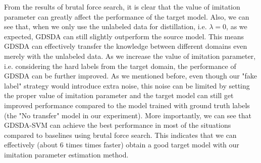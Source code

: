 From the results of brutal force search, it is clear that the value of imitation parameter can greatly affect the performance of the target model.
Also, we can see that, when we only use the unlabeled data for distillation, i.e. $\lambda = 0$, as we expected, GDSDA can still slightly outperform the source model. This means GDSDA can effectively transfer the knowledge between different domains even merely with the unlabeled data. As we increase the value of imitation parameter, i.e. considering the hard labels from the target domain, the performance of GDSDA can be further improved. As we mentioned before, even though our "fake label" strategy would introduce extra noise, this noise can be limited by setting the proper value of imitation parameter and the target model can still get improved performance compared to the model trained with ground truth labels (the "No transfer" model in our experiment).
More importantly, we can see that GDSDA-SVM can achieve the best performance in most of the situations compared to baselines using brutal force search. This indicates that we can effectively (about 6 times times faster) obtain a good target model with our imitation parameter estimation method.
